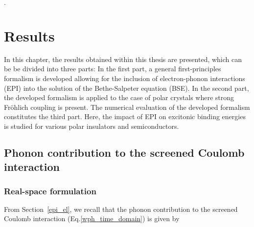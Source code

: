 \phantom.
\vspace{3cm}
\section{Results}\label{sec_phass}
In this chapter, the results obtained within this thesis are presented, which can be be divided into three parts: In the first part, a general first-principles formalism is developed allowing for the inclusion of electron-phonon interactions (EPI) into the solution of the Bethe-Salpeter equation (BSE).  In the second part, the developed formalism is applied to the case of polar crystals where strong Fr\"ohlich coupling is present. The numerical evaluation of the developed formalism constitutes the third part. Here, the impact of EPI on excitonic binding energies is studied for various polar insulators and semiconductors.

\subsection{Phonon contribution to the screened Coulomb interaction}\label{ph_contrib_sec}

\subsubsection{Real-space formulation}

From Section~\ref{epi_el}, we recall that the phonon contribution to the screened Coulomb interaction (Eq.\;\ref{wph_time_domain}) is given by 
%

